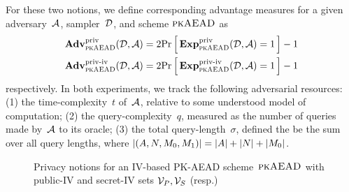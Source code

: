 For these two notions, we define corresponding advantage measures for a given adversary~${\cal A}$, sampler~${\cal D}$, and scheme $\textsc{pkAEAD}$ as
\begin{align*}
\mathbf{Adv}^{\mathrm{priv}}_{\textsc{pkAEAD}}{({\cal D},{\cal A})}&=2{\Pr\left[\,{\mathbf{Exp}^{\mathrm{priv}}_{\textsc{pkAEAD}}{({\cal D},{\cal A})}=1}\,\right]}-1\\ \mathbf{Adv}^{\mathrm{priv\textnormal{-}iv}}_{\textsc{pkAEAD}}{({\cal D},{\cal A})}&=2{\Pr\left[\,{\mathbf{Exp}^{\mathrm{priv\textnormal{-}iv}}_{\textsc{pkAEAD}}{({\cal D},{\cal A})}=1}\,\right]}-1
\end{align*}
respectively.  In both experiments, we track the following adversarial resources: (1) the time-complexity~$t$ of~${\cal A}$, relative to some understood model of computation; (2) the query-complexity~$q$, measured as the number of queries made by~${\cal A}$ to its oracle; (3) the total query-length~$\sigma$, defined the be the sum over all query lengths, where $|(A,N,M_0,M_1)|=|A|+|N|+|M_0|$.
\begin{figure}
\begin{center}
\caption{Privacy notions for an IV-based PK-AEAD scheme~$\textsc{pkAEAD}$ with public-IV and secret-IV sets $\mathcal{V}_P,\mathcal{V}_S$ (resp.)}
\label{fig:ind-cda}
\end{center}
\end{figure}



